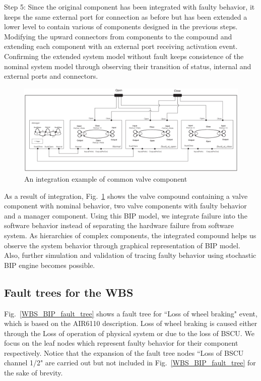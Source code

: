 Step 5: Since the original component has been integrated with faulty behavior, it keeps the same external port for connection as before but has been extended a lower level to contain various of components designed in the previous steps. Modifying the upward connectors from components to the compound and extending each component with an external port receiving activation event. Confirming the extended system model without fault keeps consistence of the nominal system model through observing their transition of status, internal and external ports and connectors.


\begin{figure}[t]
	\centerline{\includegraphics[width=125mm]{figure/Example.eps}}
	\caption{An integration example of common valve component}
	\label{Example}
\end{figure}

As a result of integration, Fig.~\ref{Example} shows the valve compound containing a valve component with nominal behavior, two valve components with faulty behavior and a manager component. Using this BIP model, we integrate failure into the software behavior instead of separating the hardware failure from software system. As hierarchies of complex components, the integrated compound helps us observe the system behavior through graphical representation of BIP model. Also, further simulation and validation of tracing faulty behavior using stochastic BIP engine becomes possible.


\subsection{Fault trees for the WBS}
Fig.~\ref{WBS_BIP_fault_tree} shows a fault tree for ``Loss of wheel braking" event, which is based on the AIR6110 description. Loss of wheel braking is caused either through the Loss of operation of physical system or due to the loss of BSCU. We focus on the leaf nodes which represent faulty behavior for their component respectively. Notice that the expansion of the fault tree nodes ``Loss of BSCU channel 1/2" are carried out but not included in Fig.~\ref{WBS_BIP_fault_tree} for the sake of brevity.

